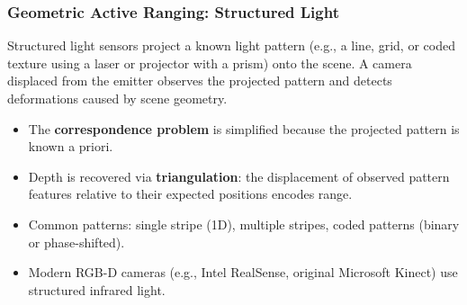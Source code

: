 \documentclass[11pt,a4paper]{article}
\theoremstyle{definition}
\theoremstyle{plain}
\theoremstyle{remark}
\begin{document}
\subsubsection*{Geometric Active Ranging: Structured Light}

Structured light sensors project a known light pattern (e.g., a line, grid, or coded texture using a laser or projector with a prism) onto the scene. A camera displaced from the emitter observes the projected pattern and detects deformations caused by scene geometry.

\begin{itemize}
    \item The \textbf{correspondence problem} is simplified because the projected pattern is known a priori.
    \item Depth is recovered via \textbf{triangulation}: the displacement of observed pattern features relative to their expected positions encodes range.
    \item Common patterns: single stripe (1D), multiple stripes, coded patterns (binary or phase-shifted).
    \item Modern RGB-D cameras (e.g., Intel RealSense, original Microsoft Kinect) use structured infrared light.
\end{itemize}
\end{document}
